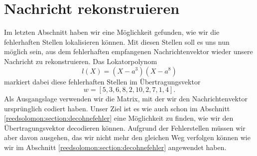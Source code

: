 %
%
%
\section{Nachricht rekonstruieren
\label{reedsolomon:section:rekonstruktion}}
Im letzten Abschnitt haben wir eine Möglichkeit gefunden, wie wir die fehlerhaften Stellen lokalisieren können.
Mit diesen Stellen soll es uns nun möglich sein, aus dem fehlerhaften empfangenen Nachrichtenvektor wieder unsere Nachricht zu rekonstruieren.
Das Lokatorpolynom
\[
l(X) = (X - a^3)(X-a^8)
\]
markiert dabei diese fehlerhaften Stellen im Übertragungsvektor
\[
w = [5,3,6,8,2,10,2,7,1,4].
\]
Als Ausgangslage verwenden wir die Matrix, mit der wir den Nachrichtenvektor ursprünglich codiert haben.
Unser Ziel ist es wie auch schon im Abschnitt \ref{reedsolomon:section:decohnefehler} eine Möglichkeit zu finden, wie wir den Übertragungsvektor decodieren können. 
Aufgrund der Fehlerstellen müssen wir aber davon ausgehen, das wir nicht mehr den gleichen Weg verfolgen können wie wir im Abschnitt \ref{reedsolomon:section:decohnefehler} angewendet haben.

